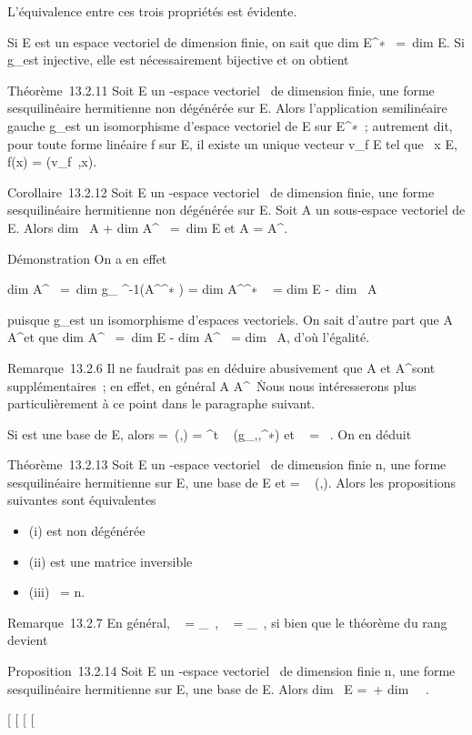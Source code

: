 \documentclass[]{article}
\begin{document}
L'équivalence entre ces trois propriétés est évidente.

Si E est un espace vectoriel de dimension finie, on sait que
dim E^∗~ =\
dim E. Si g_\phi est injective, elle est nécessairement
bijective et on obtient

Théorème~13.2.11 Soit E un -espace vectoriel ~de dimension finie, \phi une
forme sesquilinéaire hermitienne non dégénérée sur E. Alors
l'application semilinéaire gauche g_\phi est un isomorphisme
d'espace vectoriel de E sur E^∗~; autrement dit, pour toute
forme linéaire f sur E, il existe un unique vecteur v_f \in E tel
que \forall~x \in E, f(x) = \phi(v_f~,x).

Corollaire~13.2.12 Soit E un -espace vectoriel ~de dimension finie, \phi
une forme sesquilinéaire hermitienne non dégénérée sur E. Soit A un
sous-espace vectoriel de E. Alors dim~ A
+ dim A^\bot~ =\
dim E et A = A^\bot\bot.

Démonstration On a en effet

dim A^\bot~ =\
dim g_ \phi^-1(A^\bot^∗ )
= dim A^\bot^∗ ~
= dim E -\ dim~ A

puisque g_\phi est un isomorphisme d'espaces vectoriels. On sait
d'autre part que A \subset~ A^\bot\bot et que
dim A^\bot\bot~ =\
dim E - dim A^\bot~
= dim~ A, d'où l'égalité.

Remarque~13.2.6 Il ne faudrait pas en déduire abusivement que A et
A^\bot sont supplémentaires~; en effet, en général A \bigcap
A^\bot\neq~\0\.
Nous nous intéresserons plus particulièrement à ce point dans le
paragraphe suivant.

Si  est une base de E, alors \Omega =\
\mathrmMat (\phi,) =
^t \mathrmMat~
(g_\phi,,\mathcal{E}^∗) et
\mathrmrg~\phi
= \mathrmrg~\Omega. On en déduit

Théorème~13.2.13 Soit E un -espace vectoriel ~de dimension finie n, \phi
une forme sesquilinéaire hermitienne sur E,  une base de E et \Omega
= \mathrmMat~ (\phi,). Alors
les propositions suivantes sont équivalentes

\begin{itemize}
\itemsep1pt\parskip0pt\parsep0pt
\item
  (i) \phi est non dégénérée
\item
  (ii) \Omega est une matrice inversible
\item
  (iii) \mathrmrg~\phi = n.
\end{itemize}

Remarque~13.2.7 En général,
\mathrmKer~\phi
= \mathrmKerg_\phi~,
\mathrmrg~\phi
= \mathrmrgg_\phi~, si
bien que le théorème du rang devient

Proposition~13.2.14 Soit E un -espace vectoriel ~de dimension finie n,
\phi une forme sesquilinéaire hermitienne sur E,  une base de E. Alors
dim~ E =\
\mathrmrg\phi + dim~
\mathrmKer~\phi.

[
[
[
[
\end{document}
